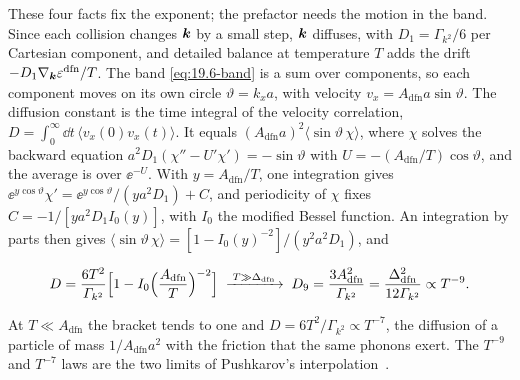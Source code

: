 These four facts fix the exponent; the prefactor needs the motion in the band. Since each collision changes $\bm{k}$ by a small step, $\bm{k}$ diffuses, with $D_1 = \varGamma_{k^2}/6$ per Cartesian component, and detailed balance at temperature $T$ adds the drift $-D_1\nabla_{\bm{k}}\varepsilon^{\mathrm{dfn}}/T$. The band \cref{eq:19.6-band} is a sum over components, so each component moves on its own circle $\vartheta = k_xa$, with velocity $v_x = A_{\mathrm{dfn}}a\sin\vartheta$. The diffusion constant is the time integral of the velocity correlation, $D = \int_0^\infty\dd t\,\langle v_x(0)v_x(t)\rangle$. It equals $(A_{\mathrm{dfn}}a)^2\langle\sin\vartheta\,\chi\rangle$, where $\chi$ solves the backward equation $a^2D_1(\chi'' - U'\chi') = -\sin\vartheta$ with $U = -(A_{\mathrm{dfn}}/T)\cos\vartheta$, and the average is over $\ee^{-U}$. With $y = A_{\mathrm{dfn}}/T$, one integration gives $\ee^{y\cos\vartheta}\chi' = \ee^{y\cos\vartheta}/(ya^2D_1) + C$, and periodicity of $\chi$ fixes $C = -1/[ya^2D_1I_0(y)]$, with $I_0$ the modified Bessel function. An integration by parts then gives $\langle\sin\vartheta\,\chi\rangle = [1 - I_0(y)^{-2}]/(y^2a^2D_1)$, and
\begin{keyresult}
\begin{equation}
  D = \frac{6T^2}{\varGamma_{k^2}}\Bigl[1 - I_0\Bigl(\frac{A_{\mathrm{dfn}}}{T}\Bigr)^{-2}\Bigr]
  \;\xrightarrow{\;T \gg \Delta_{\mathrm{dfn}}\;}\; D_9 = \frac{3A_{\mathrm{dfn}}^2}{\varGamma_{k^2}} = \frac{\Delta_{\mathrm{dfn}}^2}{12\varGamma_{k^2}} \propto T^{-9} .
  \label{eq:19.6-D}
\end{equation}
\end{keyresult}
\noindent At $T \ll A_{\mathrm{dfn}}$ the bracket tends to one and $D = 6T^2/\varGamma_{k^2} \propto T^{-7}$, the diffusion of a particle of mass $1/A_{\mathrm{dfn}}a^2$ with the friction that the same phonons exert. The $T^{-9}$ and $T^{-7}$ laws are the two limits of Pushkarov's interpolation~\cite[Eqs.~(61), (64)]{pushkarov2004quantum}.

